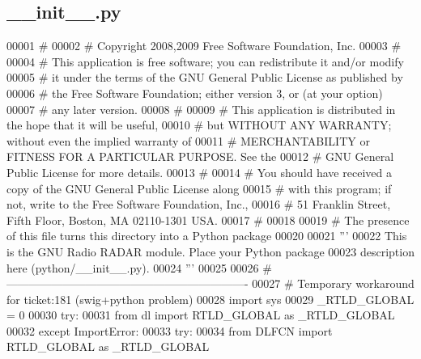 \subsection{\+\_\+\+\_\+init\+\_\+\+\_\+.\+py}
\label{python_2____init_____8py_source}

\begin{DoxyCode}
00001 \textcolor{comment}{#}
00002 \textcolor{comment}{# Copyright 2008,2009 Free Software Foundation, Inc.}
00003 \textcolor{comment}{#}
00004 \textcolor{comment}{# This application is free software; you can redistribute it and/or modify}
00005 \textcolor{comment}{# it under the terms of the GNU General Public License as published by}
00006 \textcolor{comment}{# the Free Software Foundation; either version 3, or (at your option)}
00007 \textcolor{comment}{# any later version.}
00008 \textcolor{comment}{#}
00009 \textcolor{comment}{# This application is distributed in the hope that it will be useful,}
00010 \textcolor{comment}{# but WITHOUT ANY WARRANTY; without even the implied warranty of}
00011 \textcolor{comment}{# MERCHANTABILITY or FITNESS FOR A PARTICULAR PURPOSE.  See the}
00012 \textcolor{comment}{# GNU General Public License for more details.}
00013 \textcolor{comment}{#}
00014 \textcolor{comment}{# You should have received a copy of the GNU General Public License along}
00015 \textcolor{comment}{# with this program; if not, write to the Free Software Foundation, Inc.,}
00016 \textcolor{comment}{# 51 Franklin Street, Fifth Floor, Boston, MA 02110-1301 USA.}
00017 \textcolor{comment}{#}
00018 
00019 \textcolor{comment}{# The presence of this file turns this directory into a Python package}
00020 
00021 \textcolor{stringliteral}{'''}
00022 \textcolor{stringliteral}{This is the GNU Radio RADAR module. Place your Python package}
00023 \textcolor{stringliteral}{description here (python/\_\_init\_\_.py).}
00024 \textcolor{stringliteral}{'''}
00025 
00026 \textcolor{comment}{# ----------------------------------------------------------------}
00027 \textcolor{comment}{# Temporary workaround for ticket:181 (swig+python problem)}
00028 \textcolor{keyword}{import} sys
00029 \_RTLD\_GLOBAL = 0
00030 \textcolor{keywordflow}{try}:
00031     \textcolor{keyword}{from} dl \textcolor{keyword}{import} RTLD\_GLOBAL \textcolor{keyword}{as} \_RTLD\_GLOBAL
00032 \textcolor{keywordflow}{except} ImportError:
00033     \textcolor{keywordflow}{try}:
00034     \textcolor{keyword}{from} DLFCN \textcolor{keyword}{import} RTLD\_GLOBAL \textcolor{keyword}{as} \_RTLD\_GLOBAL

\end{DoxyCode}
